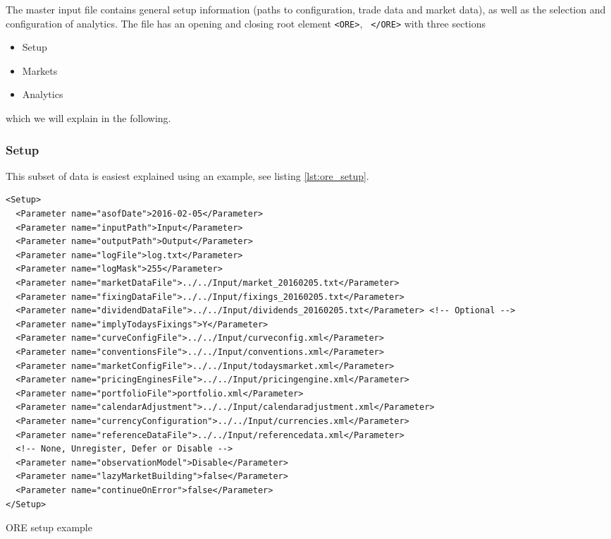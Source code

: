 \documentclass[12pt, a4paper]{article}
\begin{document}
{The master input file contains general setup information (paths to configuration, trade data and market data), as well
as the selection and configuration of analytics. The file has an opening and closing root element {\tt <ORE>}, {\tt
  </ORE>} with three sections
\begin{itemize}
\item Setup
\item Markets
\item Analytics
\end{itemize}
which we will explain in the following.

\subsubsection{Setup}

This subset of data is easiest explained using an example, see listing \ref{lst:ore_setup}.
\begin{listing}[H]
\begin{verbatim}
<Setup>
  <Parameter name="asofDate">2016-02-05</Parameter>
  <Parameter name="inputPath">Input</Parameter>
  <Parameter name="outputPath">Output</Parameter>
  <Parameter name="logFile">log.txt</Parameter>
  <Parameter name="logMask">255</Parameter>
  <Parameter name="marketDataFile">../../Input/market_20160205.txt</Parameter>
  <Parameter name="fixingDataFile">../../Input/fixings_20160205.txt</Parameter>
  <Parameter name="dividendDataFile">../../Input/dividends_20160205.txt</Parameter> <!-- Optional -->
  <Parameter name="implyTodaysFixings">Y</Parameter>
  <Parameter name="curveConfigFile">../../Input/curveconfig.xml</Parameter>
  <Parameter name="conventionsFile">../../Input/conventions.xml</Parameter>
  <Parameter name="marketConfigFile">../../Input/todaysmarket.xml</Parameter>
  <Parameter name="pricingEnginesFile">../../Input/pricingengine.xml</Parameter>
  <Parameter name="portfolioFile">portfolio.xml</Parameter>
  <Parameter name="calendarAdjustment">../../Input/calendaradjustment.xml</Parameter>
  <Parameter name="currencyConfiguration">../../Input/currencies.xml</Parameter>
  <Parameter name="referenceDataFile">../../Input/referencedata.xml</Parameter>
  <!-- None, Unregister, Defer or Disable -->
  <Parameter name="observationModel">Disable</Parameter>
  <Parameter name="lazyMarketBuilding">false</Parameter>
  <Parameter name="continueOnError">false</Parameter>
</Setup>
\end{verbatim}
\caption{ORE setup example}
\label{lst:ore_setup}
\end{listing}

}
\end{document}
